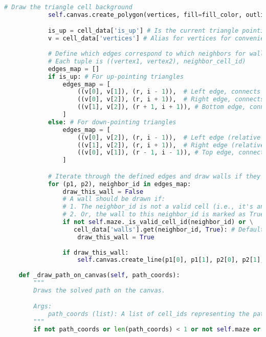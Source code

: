 \documentclass[UTF8]{report}
\theoremstyle{MyLineTheoremStyle} %
\theoremstyle{MyBlockTheoremStyle} %
\theoremstyle{MySubsubsectionStyle} %
\begin{document}
\begin{lstlisting}[language=Python, caption={迷宫生成与求解程序代码}]
            # Draw the triangle cell background
            self.canvas.create_polygon(vertices, fill=fill_color, outline='') 

            is_up = cell_data['is_up'] # Is the current triangle pointing up?
            v = cell_data['vertices'] # Alias for vertices for convenience
            
            # Define which edges correspond to which neighbors for wall drawing
            # Each tuple is ((vertex1, vertex2), neighbor_cell_id)
            edges_map = []
            if is_up: # For up-pointing triangles
                edges_map = [
                    ((v[0], v[1]), (r, i - 1)),  # Left edge, connects to left neighbor (r, i-1)
                    ((v[0], v[2]), (r, i + 1)),  # Right edge, connects to right neighbor (r, i+1)
                    ((v[1], v[2]), (r + 1, i + 1)), # Bottom edge, connects to neighbor below (r+1, i+1)
                ]
            else: # For down-pointing triangles
                edges_map = [
                    ((v[0], v[2]), (r, i - 1)),  # Left edge (relative to orientation), connects to (r, i-1)
                    ((v[1], v[2]), (r, i + 1)),  # Right edge (relative to orientation), connects to (r, i+1)
                    ((v[0], v[1]), (r - 1, i - 1)), # Top edge, connects to neighbor above (r-1, i-1)
                ]

            # Iterate through the defined edges and draw walls if they exist
            for (p1, p2), neighbor_id in edges_map:
                draw_this_wall = False
                # A wall should be drawn if:
                # 1. The neighbor_id is not a valid cell (i.e., it's an outer boundary).
                # 2. Or, the wall to this neighbor_id is marked as True (closed) in cell_data.
                if not self.maze._is_valid_cell_id(neighbor_id) or \
                   cell_data['walls'].get(neighbor_id, True): # Default to True if neighbor not in walls dict
                    draw_this_wall = True
                
                if draw_this_wall:
                    self.canvas.create_line(p1[0], p1[1], p2[0], p2[1], fill=wall_color, width=wall_width)
    
    def _draw_path_on_canvas(self, path_coords):
        """
        Draws the solved path on the canvas.

        Args:
            path_coords (list): A list of cell_ids representing the path.
        """
        if not path_coords or len(path_coords) < 1 or not self.maze or not self.maze.cells: return
        

\end{lstlisting}
\end{document}

